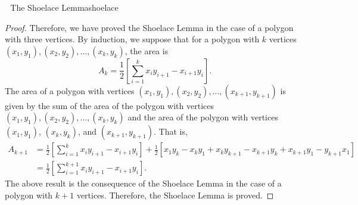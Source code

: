 \begin{exercise}{\Difficulty\,\Difficulty\,\Difficulty\,\,The Shoelace Lemma}{shoelace}
\begin{proof}
                Therefore, we have proved the Shoelace Lemma in the case of a polygon with three vertices. By induction, we suppose that for a polygon with \(k\) vertices \((x_1, y_1), (x_2, y_2), \ldots, (x_k, y_k)\), the area is
                \begin{equation*}
                    A_k=\frac{1}{2}\left[\sum_{i=1}^k x_iy_{i+1}-x_{i+1}y_i \right].
                \end{equation*}
                The area of a polygon with vertices \((x_1, y_1), (x_2, y_2), \ldots, (x_{k+1}, y_{k+1})\) is given by the sum of the area of the polygon with vertices \((x_1, y_1), (x_2, y_2), \ldots, (x_k, y_k)\) and the area of the polygon with vertices \((x_1, y_1)\), \((x_k, y_k)\), and \((x_{k+1}, y_{k+1})\). That is,
                \begin{align*}
                    A_{k+1}&=\frac{1}{2}\left[\sum_{i=1}^k x_iy_{i+1}-x_{i+1}y_i \right]+\frac{1}{2}\left[x_1y_k-x_ky_1+x_ky_{k+1}-x_{k+1}y_k+x_{k+1}y_1-y_{k+1}x_1\right] \\
                    &=\frac{1}{2}\left[\sum_{i=1}^{k+1} x_iy_{i+1}-x_{i+1}y_i \right].
                \end{align*}
                The above result is the consequence of the Shoelace Lemma in the case of a polygon with \(k+1\) vertices. Therefore, the Shoelace Lemma is proved.
            \end{proof}
        \end{exercise}
